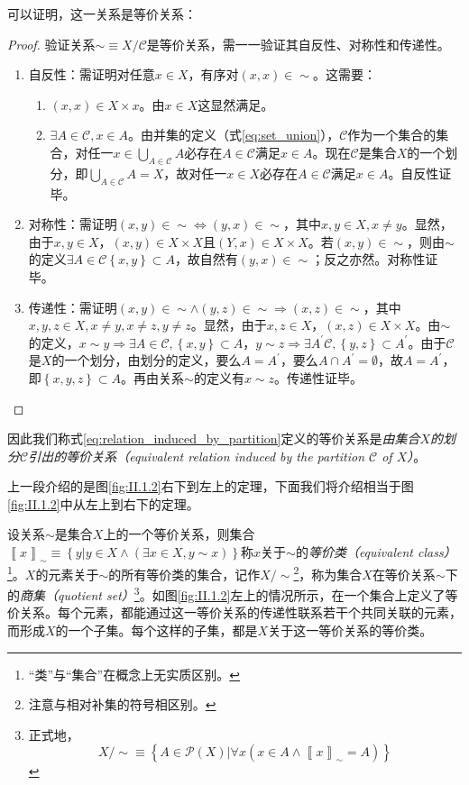 \documentclass[../main.tex]{subfiles}
\begin{document}
可以证明，这一关系是等价关系：
\begin{proof}
    验证关系$\sim\equiv X/\mathcal{C}$是等价关系，需一一验证其自反性、对称性和传递性。
    \begin{enumerate}
        \item 自反性：需证明对任意$x\in X$，有序对$\left(x,x\right)\in\sim$。这需要：
              \begin{enumerate}
                  \item $\left(x,x\right)\in X\times x$。由$x\in X$这显然满足。
                  \item $\exists A\in\mathcal{C},x\in A$。由并集的定义（式\eqref{eq:set_union}），$\mathcal{C}$作为一个集合的集合，对任一$x\in\bigcup_{A\in\mathcal{C}}A$必存在$A\in\mathcal{C}$满足$x\in A$。现在$\mathcal{C}$是集合$X$的一个划分，即$\bigcup_{A\in\mathcal{C}}A=X$，故对任一$x\in X$必存在$A\in\mathcal{C}$满足$x\in A$。自反性证毕。
              \end{enumerate}
        \item 对称性：需证明$\left(x,y\right)\in\sim\Leftrightarrow\left(y,x\right)\in\sim$，其中$x,y\in X,x\neq y$。显然，由于$x,y\in X$，$\left(x,y\right)\in X\times X$且$\left(Y,x\right)\in X\times X$。若$\left(x,y\right)\in\sim$，则由$\sim$的定义$\exists A\in\mathcal{C}\left\{x,y\right\}\subset A$，故自然有$\left(y,x\right)\in\sim$；反之亦然。对称性证毕。
        \item 传递性：需证明$\left(x,y\right)\in\sim\wedge\left(y,z\right)\in\sim\Rightarrow\left(x,z\right)\in\sim$，其中$x,y,z\in X,x\neq y,x\neq z,y\neq z$。显然，由于$x,z\in X$，$\left(x,z\right)\in X\times X$。由$\sim$的定义，$x\sim y\Rightarrow\exists A\in\mathcal{C},\left\{x,y\right\}\subset A$，$y\sim z\Rightarrow\exists A^\prime\mathcal{C},\left\{y,z\right\}\subset A^\prime$。由于$\mathcal{C}$是$X$的一个划分，由划分的定义，要么$A=A^\prime$，要么$A\cap A^\prime=\emptyset$，故$A=A^\prime$，即$\left\{x,y,z\right\}\subset A$。再由关系$\sim$的定义有$x\sim z$。传递性证毕。
    \end{enumerate}
\end{proof}
因此我们称式\eqref{eq:relation_induced_by_partition}定义的等价关系是\emph{由集合$X$的划分$\mathcal{C}$引出的等价关系（equivalent relation induced by the partition $\mathcal{C}$ of $X$）}。

上一段介绍的是图\ref{fig:II.1.2}右下到左上的定理，下面我们将介绍相当于图\ref{fig:II.1.2}中从左上到右下的定理。

设关系$\sim$是集合$X$上的一个等价关系，则集合$\left\llbracket x\right\rrbracket_\sim\equiv\left\{y|y\in X\wedge\left(\exists x\in X,y\sim x\right)\right\}$称$x$关于$\sim$的\emph{等价类（equivalent class）}\footnote{“类”与“集合”在概念上无实质区别。}。$X$的元素关于$\sim$的所有等价类的集合，记作$X/\sim$\footnote{注意与相对补集的符号相区别。}，称为集合$X$在等价关系$\sim$下的\emph{商集（quotient set）}\footnote{正式地，
    \[
        X/\sim\equiv\left\{A\in\mathcal{P}\left(X\right)|\forall x\left(x\in A\wedge\left\llbracket x\right\rrbracket_\sim = A\right)\right\}
    \]
}。如图\ref{fig:II.1.2}左上的情况所示，在一个集合上定义了等价关系。每个元素，都能通过这一等价关系的传递性联系若干个共同关联的元素，而形成$X$的一个子集。每个这样的子集，都是$X$关于这一等价关系的等价类。
\end{document}
